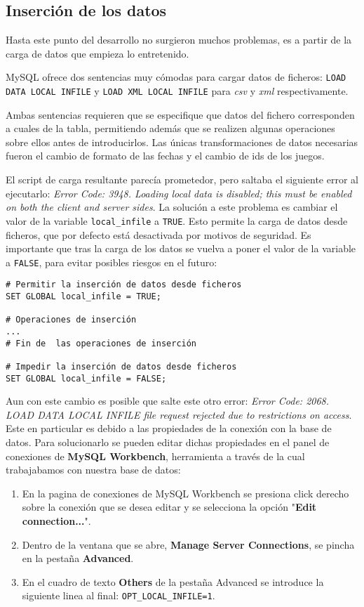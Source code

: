 \documentclass[a4paper, 11pt, oneside]{article} %
\begin{document}
\subsection{Inserción de los datos}

Hasta este punto del desarrollo no surgieron muchos problemas, es a partir de la carga de datos que empieza lo entretenido.

MySQL ofrece dos sentencias muy cómodas para cargar datos de ficheros: \texttt{LOAD DATA LOCAL INFILE} y \texttt{LOAD XML LOCAL INFILE} para \emph{csv} y \emph{xml} respectivamente.

Ambas sentencias requieren que se especifique que datos del fichero corresponden a cuales de la tabla, permitiendo además que se realizen algunas operaciones sobre ellos antes de introducirlos. Las únicas transformaciones de datos necesarias fueron el cambio de formato de las fechas y el cambio de ids de los juegos.

El script de carga resultante parecía prometedor, pero saltaba el siguiente error al ejecutarlo: \emph{Error Code: 3948. Loading local data is disabled; this must be enabled on both the client and server sides}. La solución a este problema es cambiar el valor de la variable \texttt{local_infile} a \texttt{TRUE}. Esto permite la carga de datos desde ficheros, que por defecto está desactivada por motivos de seguridad. Es importante que tras la carga de los datos se vuelva a poner el valor de la variable a \texttt{FALSE}, para evitar posibles riesgos en el futuro:

\begin{verbatim}
# Permitir la inserción de datos desde ficheros
SET GLOBAL local_infile = TRUE;

# Operaciones de inserción
...
# Fin de  las operaciones de inserción

# Impedir la inserción de datos desde ficheros
SET GLOBAL local_infile = FALSE;
\end{verbatim}

Aun con este cambio es posible que salte este otro error: \emph{Error Code: 2068. LOAD DATA LOCAL INFILE file request rejected due to restrictions on access}. Este en particular es debido a las propiedades de la conexión con la base de datos. Para solucionarlo se pueden editar dichas propiedades en el panel de conexiones de \textbf{MySQL Workbench}, herramienta a través de la cual trabajabamos con nuestra base de datos:

\begin{enumerate}
	\item En la pagina de conexiones de MySQL Workbench se presiona click derecho sobre la conexión que se desea editar y se selecciona la opción "\textbf{Edit connection...}".
	\item Dentro de la ventana que se abre, \textbf{Manage Server Connections}, se pincha en la pestaña \textbf{Advanced}.
	\item En el cuadro de texto \textbf{Others} de la pestaña Advanced se introduce la siguiente linea al final: \texttt{OPT_LOCAL_INFILE=1}.
\end{enumerate}
\end{document}
